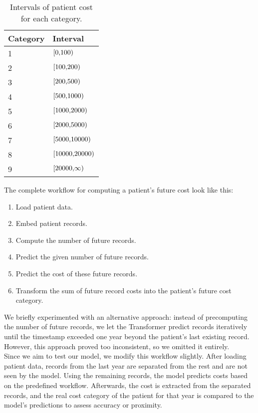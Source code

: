 \begin{table}[!h]
	\centering
	\begin{tabular}{|l|l|}
		\hline
		Category  & Interval \\ \hline
		1 & $\interval[{0,100})$ \\ \hline
		2 & $\interval[{100,200})$ \\ \hline
		3 & $\interval[{200,500})$ \\ \hline
		4 & $\interval[{500,1000})$ \\ \hline
		5 & $\interval[{1000,2000})$ \\ \hline
		6 & $\interval[{2000,5000})$ \\ \hline
		7 & $\interval[{5000,10000})$ \\ \hline
		8 & $\interval[{10000,20000})$ \\ \hline
		9 & $\interval[{20000,\infty})$ \\ \hline
	\end{tabular}
	\caption{Intervals of patient cost for each category.}
	\label{tab:patCost}
\end{table}  

The complete workflow for computing a patient’s future cost look like this:

\begin{enumerate}
	\item Load patient data.
	\item Embed patient records.
	\item Compute the number of future records.
	\item Predict the given number of future records.
	\item Predict the cost of these future records.
	\item Transform the sum of future record costs into the patient’s future cost category.
\end{enumerate}

We briefly experimented with an alternative approach: instead of precomputing the number of future records, we let the Transformer predict records iteratively until the timestamp exceeded one year beyond the patient's last existing record. However, this approach proved too inconsistent, so we omitted it entirely.
\\

Since we aim to test our model, we modify this workflow slightly. After loading patient data, records from the last year are separated from the rest and are not seen by the model. Using the remaining records, the model predicts costs based on the predefined workflow. Afterwards, the cost is extracted from the separated records, and the real cost category of the patient for that year is compared to the model’s predictions to assess accuracy or proximity.
\\

